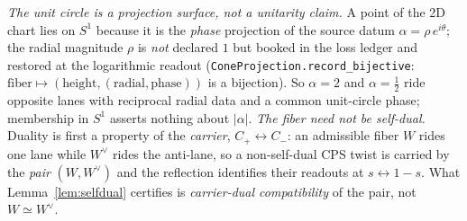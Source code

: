 \documentclass[11pt]{article}
\theoremstyle{definition}
\begin{document}
\noindent\emph{The unit circle is a projection surface, not a unitarity claim.} A point of the 2D chart lies
on $S^1$ because it is the \emph{phase} projection of the source datum $\alpha=\rho\,e^{i\theta}$; the radial
magnitude $\rho$ is \emph{not} declared $1$ but booked in the loss ledger and restored at the logarithmic
readout (\texttt{ConeProjection.record\_bijective}: $\text{fiber}\mapsto(\text{height},(\text{radial},\text{phase}))$
is a bijection). So $\alpha=2$ and $\alpha=\tfrac12$ ride opposite lanes with reciprocal radial data and a
common unit-circle phase; membership in $S^1$ asserts nothing about $|\alpha|$. \emph{The fiber need not be
self-dual.} Duality is first a property of the \emph{carrier}, $C_+\leftrightarrow C_-$: an admissible fiber
$W$ rides one lane while $W^\vee$ rides the anti-lane, so a non-self-dual CPS twist is carried by the
\emph{pair} $(W,W^\vee)$ and the reflection identifies their readouts at $s\leftrightarrow1-s$. What
Lemma~\ref{lem:selfdual} certifies is \emph{carrier-dual compatibility} of the pair, not $W\simeq W^\vee$.
\end{document}
